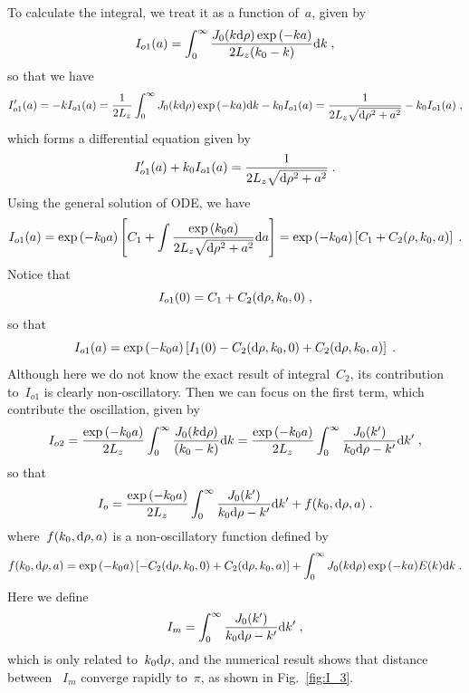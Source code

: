 To calculate the integral, we treat it as a function of~$a$, given by
\begin{equation}
    I_{o1}(a) = \int_0^{\infty} \frac{J_0(k \mathrm{d} \rho) \exp{(-k a)}}{2L_z(k_0 - k)} \text{d}k\;,
\end{equation}
so that we have
\begin{equation}
    I_{o1}^{\prime}(a) = - k I_{o1}(a) = \frac{1}{2L_z} \int_0^{\infty} J_0(k \mathrm{d} \rho) \exp{(-k a)} \text{d}k - k_0 I_{o1}(a) = \frac{1}{2L_z \sqrt{\mathrm{d} \rho^2 + a^2}} - k_0 I_{o1}(a) \;,
\end{equation}
which forms a differential equation given by
\begin{equation}
    I_{o1}^{\prime}(a) + k_0 I_{o1}(a) = \frac{1}{2L_z \sqrt{\mathrm{d} \rho^2 + a^2}}\;.
\end{equation}
Using the general solution of ODE, we have
\begin{equation}
    I_{o1}(a) = \exp{(-k_0 a)} \left[C_1 + \int \frac{\exp{(k_0 a)}}{2L_z \sqrt{\mathrm{d} \rho^2 + a^2}} \text{d}a \right] = \exp{(-k_0 a)} \left[C_1 + C_2(\rho, k_0, a) \right] \;.
\end{equation}
Notice that
\begin{equation}
    I_{o1}(0) = C_1 + C_2(\mathrm{d} \rho, k_0, 0)\;,
\end{equation}
so that
\begin{equation}
    I_{o1}(a) = \exp{(-k_0 a)} \left[ I_1(0) - C_2(\mathrm{d} \rho, k_0, 0) + C_2(\mathrm{d} \rho, k_0, a) \right]\;.
\end{equation}
Although here we do not know the exact result of integral~$C_2$, its contribution to~$I_{o1}$ is clearly non-oscillatory.
Then we can focus on the first term, which contribute the oscillation, given by 
\begin{equation}
    I_{o2} = \frac{\exp{(-k_0 a)}}{2L_z} \int_0^{\infty} \frac{J_0(k \mathrm{d} \rho)}{(k_0 - k)} \text{d}k = \frac{\exp{(-k_0 a)}}{2L_z} \int_0^{\infty} \frac{J_0(k^\prime)}{k_0 \mathrm{d} \rho - k^\prime} \text{d}k^\prime\;,
\end{equation}
so that 
\begin{equation}
    I_o = \frac{\exp{(-k_0 a)}}{2L_z} \int_0^{\infty} \frac{J_0(k^\prime)}{k_0 \mathrm{d} \rho - k^\prime} \text{d}k^\prime + f(k_0, \mathrm{d} \rho, a)\;.
\end{equation}
where~$f(k_0, \mathrm{d} \rho, a)$ is a non-oscillatory function defined by
\begin{equation}
    f(k_0, \mathrm{d} \rho, a) = \exp{(-k_0 a)} \left[ - C_2(\mathrm{d} \rho, k_0, 0) + C_2(\mathrm{d} \rho, k_0, a) \right] + \int_0^{\infty} J_0(k \mathrm{d} \rho) \exp{(-k a)} E(k) \text{d}k\;.
\end{equation}
Here we define
\begin{equation}
    I_{m} = \int_0^{\infty} \frac{J_0(k^\prime)}{k_0 \mathrm{d} \rho - k^\prime} \text{d}k^\prime\;,
\end{equation}
which is only related to~$k_0 \mathrm{d} \rho$, and the numerical result shows that distance between ~$I_{m}$ converge rapidly to~$\pi$, as shown in Fig.~\ref{fig:I_3}.

